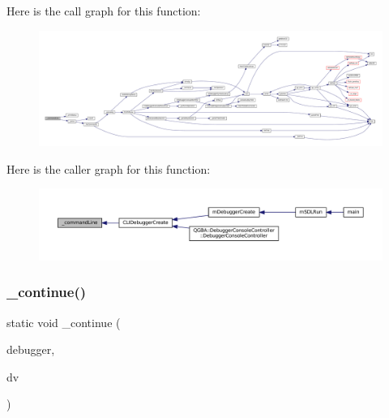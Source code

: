Here is the call graph for this function\+:
\nopagebreak
\begin{figure}[H]
\begin{center}
\leavevmode
\includegraphics[width=350pt]{debugger_2cli-debugger_8c_ab978c53f9260e7091de8564374a914bb_cgraph}
\end{center}
\end{figure}
Here is the caller graph for this function\+:
\nopagebreak
\begin{figure}[H]
\begin{center}
\leavevmode
\includegraphics[width=350pt]{debugger_2cli-debugger_8c_ab978c53f9260e7091de8564374a914bb_icgraph}
\end{center}
\end{figure}
\mbox{\label{debugger_2cli-debugger_8c_ad40afb46823b93907981724d646a3f1f}} 
\subsubsection{\texorpdfstring{\+\_\+continue()}{\_continue()}}
{\footnotesize\ttfamily static void \+\_\+continue (\begin{DoxyParamCaption}\item[{struct C\+L\+I\+Debugger $\ast$}]{debugger,  }\item[{struct C\+L\+I\+Debug\+Vector $\ast$}]{dv }\end{DoxyParamCaption})\hspace{0.3cm}{\ttfamily [static]}}

\mbox{\label{debugger_2cli-debugger_8c_a4b92eb025348b2a060a49ffffff5f07d}} 
